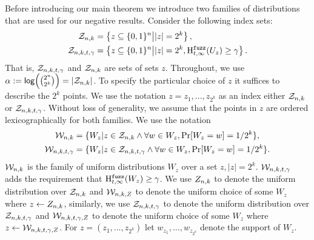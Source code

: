
\label{sec:family}
Before introducing our main theorem we introduce two families of distributions that are used for our negative results.  Consider the following index sets:
\begin{align*}
\mathcal{Z}_{n,k} &=\left\{z \subseteq \{0, 1\}^n\middle|  |z| = 2^k\right\},\\
\mathcal{Z}_{n,k,t,\gamma} &= \left\{z \subseteq \{0, 1\}^n\middle| |z| = 2^k,\mathrm{H}^{\mathtt{fuzz}}_{t,\infty}(U_z) \ge \gamma\right\}.
\end{align*}
That is, $\mathcal{Z}_{n,k,t,\gamma}$ and $\mathcal{Z}_{n,k}$ are sets of sets $z$.  Throughout, we use $\alpha:= \mathsf{log}\!\left({2^n\choose 2^k}\right) = |\mathcal{Z}_{n,k}|$. To specify the particular choice of $z$ it suffices to describe the $2^k$ points.  We use the notation $z = z_{1},..., z_{2^k}$ as an index either $\mathcal{Z}_{n,k}$ or $\mathcal{Z}_{n,k,t,\gamma}$. Without loss of generality, we assume that the points in $z$ are ordered lexicographically for both families.  
We use the notation 
\begin{align*}
\mathcal{W}_{n,k} &=\{W_z | z \in \mathcal{Z}_{n,k}  \wedge \forall w \in W_z, \Pr[W_z=w]=1/2^k\},\\
\mathcal{W}_{n,k,t,\gamma} &= \{W_z | z\in \mathcal{Z}_{n,k,t,\gamma} \wedge \forall w \in W_z, \Pr[W_z=w]=1/2^k\}.
\end{align*}
$\mathcal{W}_{n,k}$ is the family of uniform distributions $W_z$ over a set $z, |z|=2^k$.
$\mathcal{W}_{n,k,t,\gamma}$ adds the requirement that $\mathrm{H}^{\mathtt{fuzz}}_{t,\infty}(W_z)\ge\gamma$. We use $Z_{n,k}$ to denote the uniform distribution over $\mathcal{Z}_{n,k}$ and $\mathcal{W}_{n,k, Z}$ to denote the uniform choice of some $W_z$ where $z\leftarrow Z_{n,k}$, similarly, we use $\mathcal{Z}_{n,k,t,\gamma}$ to denote the uniform distribution over $\mathcal{Z}_{n,k,t,\gamma}$ and $\mathcal{W}_{n,k,t,\gamma, Z}$ to denote the uniform choice of some $W_z$ where $z\leftarrow \mathcal{W}_{n,k,t,\gamma, Z}$. For $z=(z_1,..., z_{2^k})$ let $w_{z_1},..., w_{z_{2^k}}$ denote the support of $W_z$.